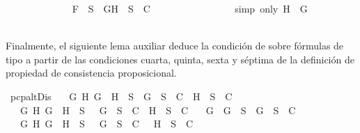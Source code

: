 \begin{isabellebody}
\ \ \ \ \ \ \ \ \ \ \ \ \isamarkupfalse%
\ {\isachardoublequoteopen}F\ {\isasymin}\ S\ {\isasymlongrightarrow}\ {\isacharbraceleft}G{\isacharcomma}H{\isacharbraceright}\ {\isasymunion}\ S\ {\isasymin}\ C{\isachardoublequoteclose}\ \isanewline
\ \ \ \ \ \ \ \ \ \ \ \ \ \ \isamarkupfalse%
\ {\isacharparenleft}simp\ only{\isacharcolon}\ {\isacartoucheopen}H\ {\isacharequal}\ G{\isacartoucheclose}{\isacharparenright}\isanewline
\ \ \ \ \ \ \ \ \ \ \isamarkupfalse%
\isanewline
\ \ \ \ \ \ \ \ \isamarkupfalse%
\isanewline
\ \ \ \ \ \ \isamarkupfalse%
\isanewline
\ \ \ \ \isamarkupfalse%
\isanewline
\ \ \isamarkupfalse%
\isanewline
{}\isamarkupfalse%
%
\endisatagproof
{\isafoldproof}%
%
\isadelimproof
%
\endisadelimproof
%
\begin{isamarkuptext}%
Finalmente, el siguiente lema auxiliar deduce la condición de  sobre fórmulas de tipo \isa{{\isasymbeta}} 
  a partir de las condiciones cuarta, quinta, sexta y séptima de la definición de propiedad de 
  consistencia proposicional.%
\end{isamarkuptext}\isamarkuptrue%
\isamarkupfalse%
\ pcp{\isacharunderscore}alt{}Dis{\isacharcolon}\isanewline
\ \ \ {\isachardoublequoteopen}{\isacharparenleft}{\isasymforall}G\ H{\isachardot}\ G\ \isactrlbold {\isasymor}\ H\ {\isasymin}\ S\ {\isasymlongrightarrow}\ {\isacharbraceleft}G{\isacharbraceright}\ {\isasymunion}\ S\ {\isasymin}\ C\ {\isasymor}\ {\isacharbraceleft}H{\isacharbraceright}\ {\isasymunion}\ S\ {\isasymin}\ C{\isacharparenright}\isanewline
\ \ {\isasymand}\ {\isacharparenleft}{\isasymforall}G\ H{\isachardot}\ G\ \isactrlbold {\isasymrightarrow}\ H\ {\isasymin}\ S\ {\isasymlongrightarrow}\ {\isacharbraceleft}\isactrlbold {\isasymnot}\ G{\isacharbraceright}\ {\isasymunion}\ S\ {\isasymin}\ C\ {\isasymor}\ {\isacharbraceleft}H{\isacharbraceright}\ {\isasymunion}\ S\ {\isasymin}\ C{\isacharparenright}\isanewline
\ \ {\isasymand}\ {\isacharparenleft}{\isasymforall}G{\isachardot}\ \isactrlbold {\isasymnot}\ {\isacharparenleft}\isactrlbold {\isasymnot}G{\isacharparenright}\ {\isasymin}\ S\ {\isasymlongrightarrow}\ {\isacharbraceleft}G{\isacharbraceright}\ {\isasymunion}\ S\ {\isasymin}\ C{\isacharparenright}\isanewline
\ \ {\isasymand}\ {\isacharparenleft}{\isasymforall}G\ H{\isachardot}\ \isactrlbold {\isasymnot}{\isacharparenleft}G\ \isactrlbold {\isasymand}\ H{\isacharparenright}\ {\isasymin}\ S\ {\isasymlongrightarrow}\ {\isacharbraceleft}\isactrlbold {\isasymnot}\ G{\isacharbraceright}\ {\isasymunion}\ S\ {\isasymin}\ C\ {\isasymor}\ {\isacharbraceleft}\isactrlbold {\isasymnot}\ H{\isacharbraceright}\ {\isasymunion}\ S\ {\isasymin}\ C{\isacharparenright}{\isachardoublequoteclose}\isanewline

\end{isabellebody}
